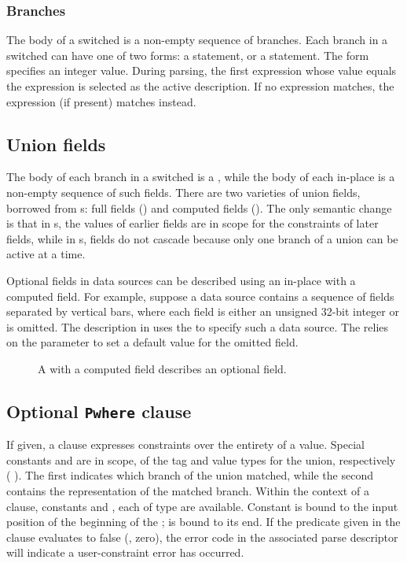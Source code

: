 \subsubsection{Branches}
The body of a switched \Punion{} is a non-empty sequence of branches.
Each branch in a switched \Punion{} can have one of two forms: a
\Pcase{} statement, or a \Pdefault{} statement.  The \Pcase{} form
specifies an integer value.  During parsing, the first \Pcase{}
expression whose value equals the \Pswitch{} expression is selected as
the active description. If no \Pcase{} expression
matches, the \Pdefault{} expression (if present) matches instead.

\subsection{Union fields}
The body of each branch in a switched \Punion{} is a ,
while the body of each in-place \Punion{} is a non-empty sequence of
such fields. 
There are two varieties of union fields, borrowed from \Pstruct{}s: 
full fields () 
and computed fields ().  
The only semantic change is that in \Pstruct{}s, the values of earlier
fields are in scope for the constraints of later fields, while in
\Punion{}s, fields do not cascade because only one branch of a union
can be active at a time.  

Optional fields in data sources can be described using an in-place
\Punion{} with a computed field.  For example, suppose a data source
contains a sequence of fields separated by vertical bars, where each
field is either an unsigned 32-bit integer or is omitted.  The
description in  
uses the \Punion{}  to specify such a data source.
The  \Punion{} relies on the parameter  to set
a default value for the omitted field.

\begin{figure}

\caption{A \Punion{} with a computed field describes an optional field.}
\label{fig:union-option}
\end{figure}

\subsection{Optional \texttt{Pwhere} clause}
If given, a \Pwhere{} clause expresses constraints over the entirety
of a \Punion{} value.  Special constants  and  are
in scope, of the tag and value types for the union, respectively
(\cf{} ).  The
first indicates which branch of the union matched, while the second
contains the representation of the matched branch. 
Within the context of a 
\Pparsecheck{} clause, constants  and , each of type 
\PDCpost{} are available.  Constant  is bound to the input
position of the beginning of the \punion{};  is bound to its end.
If the predicate given in
the \Pwhere{} clause evaluates to false (\ie{}, zero), the error code
in the associated parse descriptor will indicate a user-constraint
error has occurred.  

